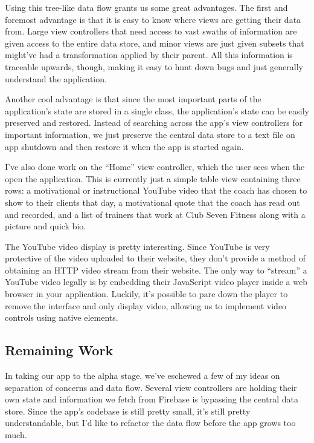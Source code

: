 \documentclass[a4paper]{article}
\begin{document}
Using this tree-like data flow grants us some great advantages. The first and foremost advantage is that it is easy to know where views are getting their data from. Large view controllers that need access to vast swaths of information are given access to the entire data store, and minor views are just given subsets that might’ve had a transformation applied by their parent. All this information is traceable upwards, though, making it easy to hunt down bugs and just generally understand the application.

Another cool advantage is that since the most important parts of the application’s state are stored in a single class, the application’s state can be easily preserved and restored. Instead of searching across the app’s view controllers for important information, we just preserve the central data store to a text file on app shutdown and then restore it when the app is started again.

I’ve also done work on the “Home” view controller, which the user sees when the open the application. This is currently just a simple table view containing three rows: a motivational or instructional YouTube video that the coach has chosen to show to their clients that day, a motivational quote that the coach has read out and recorded, and a list of trainers that work at Club Seven Fitness along with a picture and quick bio.

The YouTube video display is pretty interesting. Since YouTube is very protective of the video uploaded to their website, they don’t provide a method of obtaining an HTTP video stream from their website. The only way to “stream” a YouTube video legally is by embedding their JavaScript video player inside a web browser in your application. Luckily, it's possible to pare down the player to remove the interface and only display video, allowing us to implement video controls using native elements.

\subsection{Remaining Work}
In taking our app to the alpha stage, we’ve eschewed a few of my ideas on separation of concerns and data flow. Several view controllers are holding their own state and information we fetch from Firebase is bypassing the central data store. Since the app’s codebase is still pretty small, it’s still pretty understandable, but I’d like to refactor the data flow before the app grows too much.
\end{document}
